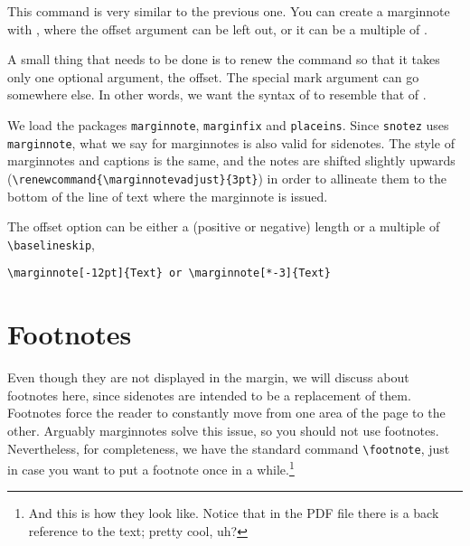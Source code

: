 This command is very similar to the previous one. You can create a 
marginnote with , where the offset 
argument can be left out, or it can be a multiple of 
.

\begin{kaobox}[frametitle=To Do]
A small thing that needs to be done is to renew the  
command so that it takes only one optional argument, the offset. The 
special mark argument can go somewhere else. In other words, we want the 
syntax of  to resemble that of .
\end{kaobox}

We load the packages \verb|marginnote|, \verb|marginfix| and 
\verb|placeins|. Since \verb|snotez| uses \verb|marginnote|, what we say 
for marginnotes is also valid for sidenotes. The style of marginnotes 
and captions is the same, and the notes are shifted slightly upwards 
(\verb|\renewcommand{\marginnotevadjust}{3pt}|) in order to allineate 
them to the bottom of the line of text where the marginnote is issued.

The offset option can be either a (positive or negative) length or a 
multiple of \verb|\baselineskip|, \eg
\begin{verbatim}
\marginnote[-12pt]{Text} or \marginnote[*-3]{Text}
\end{verbatim}

\section{Footnotes}

Even though they are not displayed in the margin, we will discuss about 
footnotes here, since sidenotes are intended to be a replacement of 
them. Footnotes force the reader to constantly move from one area of the 
page to the other. Arguably marginnotes solve this issue, so you should 
not use footnotes. Nevertheless, for completeness, we have the standard 
command \verb|\footnote|, just in case you want to put a footnote once 
in a while.\footnote{And this is how they look like. Notice that in the 
PDF file there is a back reference to the text; pretty cool, uh?}

